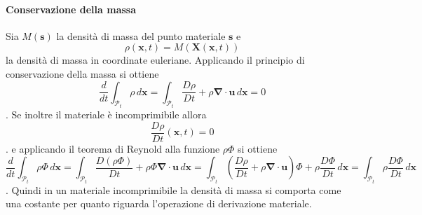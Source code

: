\documentclass{book}
\newcommand{\Nabla}{\boldsymbol{\nabla}}
\begin{document}
\paragraph{Conservazione della massa}
Sia $M(\mathbf{s})$ la densità di massa del punto materiale $\mathbf{s}$ e 
$$\rho(\mathbf{x},t)=M(\mathbf{X}(\mathbf{x},t))$$
la densità di massa in coordinate euleriane.
Applicando il principio di conservazione della massa si ottiene
$$\frac{d}{dt}\int_{\mathcal{P}_t}\rho\,d\mathbf{x}=\int_{\mathcal{P}_t}\frac{D\rho}{Dt}+\rho\Nabla\cdot\mathbf{u}\,d\mathbf{x}=0$$.
Se inoltre il materiale è incomprimibile allora 
$$\frac{D\rho}{Dt}(\mathbf{x},t)=0 $$.
e applicando il teorema di Reynold alla funzione $\rho\Phi$ si ottiene
$$\frac{d}{dt}\int_{\mathcal{P}_t}\rho\Phi\,d\mathbf{x}=\int_{\mathcal{P}_t}\frac{D(\rho\Phi)}{Dt}+\rho\Phi\Nabla\cdot\mathbf{u}\,d\mathbf{x}=\int_{\mathcal{P}_t}(\frac{D\rho}{Dt}+\rho\Nabla\cdot\mathbf{u})\Phi+\rho\frac{D\Phi}{Dt}\,d\mathbf{x}=\int_{\mathcal{P}_t}\rho\frac{D\Phi}{Dt}\,d\mathbf{x}$$.
Quindi in un materiale incomprimibile la densità di massa si comporta come una costante per quanto riguarda l'operazione di derivazione materiale.
\end{document}
